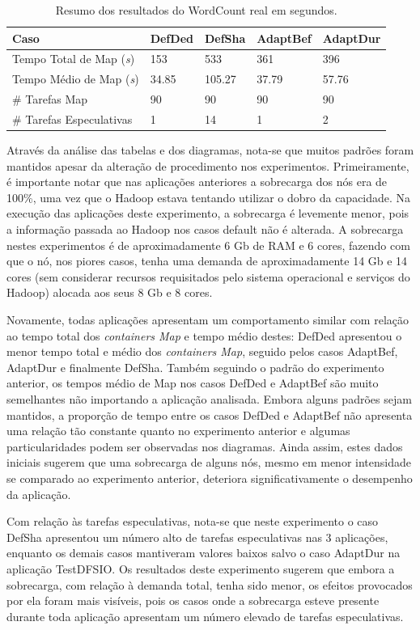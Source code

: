 \begin{table}[ht]
	\caption{Resumo dos resultados do WordCount real em segundos.} \label{tab:exp2WC}
	\begin{tabular*}{\hsize}{l|llll}
		\textbf{Caso} & \textbf{DefDed} & \textbf{DefSha} & \textbf{AdaptBef} & \textbf{AdaptDur}\\
		\hline
		Tempo Total de Map ({\it{s}}) & 153 & 533 & 361 & 396 \\
		Tempo Médio de Map ({\it{s}}) & 34.85 & 105.27 & 37.79 & 57.76 \\
		\# Tarefas Map & 90 & 90 & 90 & 90 \\
		\# Tarefas Especulativas & 1 & 14 & 1 & 2 \\
	\end{tabular*}
\end{table}

Através da análise das tabelas e dos diagramas, nota-se que muitos padrões foram mantidos apesar da alteração de procedimento nos experimentos. Primeiramente, é importante notar que nas aplicações anteriores a sobrecarga dos nós era de 100\%, uma vez que o Hadoop estava tentando utilizar o dobro da capacidade. Na execução das aplicações deste experimento, a sobrecarga é levemente menor, pois a informação passada ao Hadoop nos casos default não é alterada. A sobrecarga nestes experimentos é de aproximadamente 6 Gb de RAM e 6 cores, fazendo com que o nó, nos piores casos, tenha uma demanda de aproximadamente 14 Gb e 14 cores (sem considerar recursos requisitados pelo sistema operacional e serviços do Hadoop) alocada aos seus 8 Gb e 8 cores.

Novamente, todas aplicações apresentam um comportamento similar com relação ao tempo total dos \textit{containers Map} e tempo médio destes: DefDed apresentou o menor tempo total e médio dos \textit{containers Map}, seguido pelos casos AdaptBef, AdaptDur e finalmente DefSha. Também seguindo o padrão do experimento anterior, os tempos médio de Map nos casos DefDed e AdaptBef são muito semelhantes não importando a aplicação analisada. Embora alguns padrões sejam mantidos, a proporção de tempo entre os casos DefDed e AdaptBef não apresenta uma relação tão constante quanto no experimento anterior e algumas particularidades podem ser observadas nos diagramas. Ainda assim, estes dados iniciais sugerem que uma sobrecarga de alguns nós, mesmo em menor intensidade se comparado ao experimento anterior, deteriora significativamente o desempenho da aplicação.

Com relação às tarefas especulativas, nota-se que neste experimento o caso DefSha apresentou um número alto de tarefas especulativas nas 3 aplicações, enquanto os demais casos mantiveram valores baixos salvo o caso AdaptDur na aplicação TestDFSIO. Os resultados deste experimento sugerem que embora a sobrecarga, com relação à demanda total, tenha sido menor, os efeitos provocados por ela foram mais visíveis, pois os casos onde a sobrecarga esteve presente durante toda aplicação apresentam um número elevado de tarefas especulativas.

